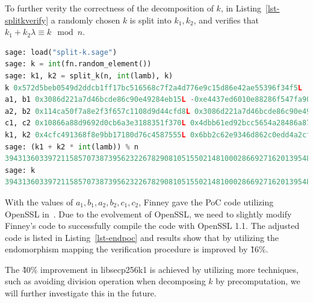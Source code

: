 \documentclass{article}
\begin{document}
To further verity the correctness of the decomposition of $k$, in Listing~\ref{lst-splitkverify}
a randomly chosen $k$ is split into $k_1, k_2$, and verifies that $k_1 + k_2\lambda\equiv k\mod n$.
\begin{lstlisting}[language=python, caption=\texttt{verify multiplier split  with $\lambda$ for secp256k1}, label=lst-splitkverify]
sage: load("split-k.sage")
sage: k = int(fn.random_element())
sage: k1, k2 = split_k(n, int(lamb), k)
k 0x572d5beb0549d2ddcb1ff17bc516568c7f2a4d776e9c15d86e42ae55396f34f5L
a1, b1 0x3086d221a7d46bcde86c90e49284eb15L -0xe4437ed6010e88286f547fa90abfe4c3L
a2, b2 0x114ca50f7a8e2f3f657c1108d9d44cfd8L 0x3086d221a7d46bcde86c90e49284eb15L
c1, c2 0x10866a88d9692d0cb6a3e3188351f370L 0x4dbb61ed92bcc5654a28486a8793676aL
k1, k2 0x4cfc491368f8e9bb17180d76c4587555L 0x6bb2c62e9346d862c0edd4a2cf1e649eL
sage: (k1 + k2 * int(lamb)) % n
39431360339721158570738739562322678290810515502148100028669271620139548095733
sage: k
39431360339721158570738739562322678290810515502148100028669271620139548095733L
\end{lstlisting}

With the values of $a_1, b_1, a_2, b_2, c_1, c_2$, Finney gave the PoC code utilizing OpenSSL in~\cite{halfinney}.
Due to the evolvement of OpenSSL, we need to slightly modify Finney's code to successfully compile the code with OpenSSL 1.1.
The adjusted code is listed in Listing~\ref{lst-endpoc} and results show that by utilizing the endomorphism mapping 
the verification procedure is improved by \~16\%.



The \~40\% improvement in libsecp256k1 is achieved by utilizing more techniques, such as 
avoiding division operation when decomposing $k$ by precomputation, we will further investigate this in the future.
\end{document}
